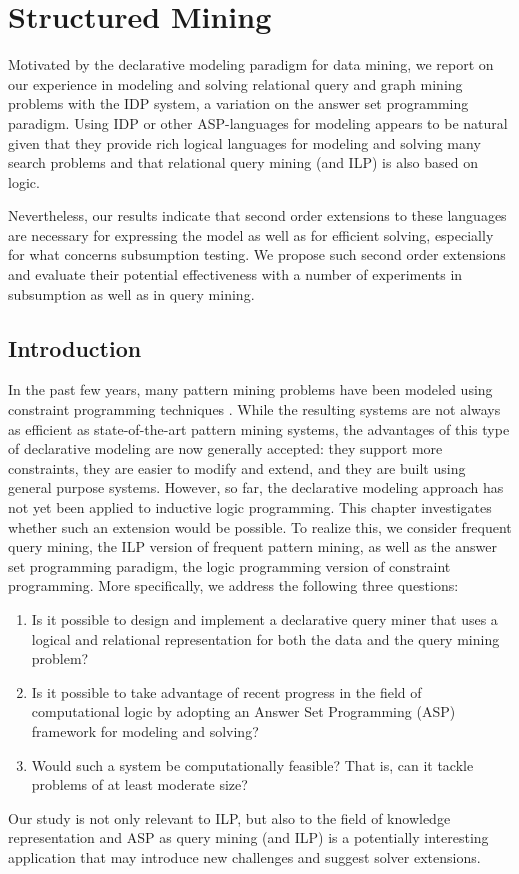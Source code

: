 \chapter{Structured Mining}\label{ch:StructuredMining}
  Motivated by the declarative modeling paradigm for data mining, we report on our experience in modeling and solving relational query and graph mining problems with the IDP system, a variation on the answer set programming paradigm. Using IDP or other ASP-languages for modeling appears to be natural given that they provide rich logical languages for modeling and solving many search problems and that relational query mining (and ILP) is also based on logic.

  Nevertheless, our results indicate that second order extensions to these languages are necessary for expressing the model as well as for efficient solving, especially for what concerns subsumption testing. We propose such second order extensions and evaluate their potential effectiveness with a number of experiments in subsumption as well as in query mining.

\section{Introduction}
\label{sec:intro}
In the past few years, many pattern mining problems have been modeled using constraint programming techniques \parencite{guns_framework}.
While the resulting systems are not always as efficient as state-of-the-art pattern mining systems,
the advantages of this type of declarative modeling are  now generally accepted: they support more constraints,
they are easier to modify and extend, and they are built using general purpose systems.
However, so far, the declarative modeling approach has not yet been applied to inductive logic programming. This chapter investigates whether such 
an extension would be possible.  To realize this, we consider frequent query mining, the ILP version of frequent pattern mining, as well as the answer set programming paradigm, the logic programming version of constraint programming. 
More specifically, we address the following three questions: 

\begin{enumerate}
\item[\qone] Is it possible to design and implement a declarative query miner that uses a logical and relational representation for both the data and the query mining problem? 
\item[\qtwo] Is it possible to take advantage of recent progress in the field of computational logic by adopting an Answer Set Programming (ASP) \parencite{eiter} framework for modeling and solving? 
\item[\qthree] Would such a system be computationally feasible? That is, can it tackle problems of at least moderate size?
\end{enumerate}
Our study is not only relevant to ILP, but also to the field of knowledge representation and ASP
as query mining (and ILP) is a potentially interesting application 
that may introduce new challenges and suggest solver extensions. 


